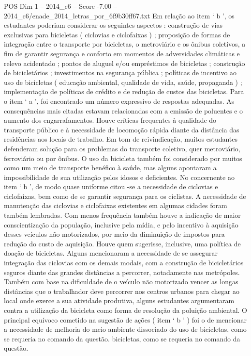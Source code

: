 \begin{textsample}{POS Dim 1 – 2014\_c6 – Score -7.00 – 2014\_c6/enade\_2014\_letras\_por\_6f9b30ff67.txt}
Em relação ao item ‘ b ’, os estudantes poderiam considerar os seguintes aspectos : construção de vias exclusivas para bicicletas ( ciclovias e ciclofaixas ) ; proposição de formas de integração entre o transporte por bicicletas, o metroviário e os ônibus coletivos, a fim de garantir segurança e conforto em momentos de adversidades climáticas e relevo acidentado ; pontos de aluguel e/ou empréstimos de bicicletas ; construção de bicicletários ; investimentos na segurança pública ; políticas de incentivo ao uso de bicicletas ( educação ambiental, qualidade de vida, saúde, propaganda ) ; implementação de políticas de crédito e de redução de custos das bicicletas.
Para o item ‘ a ’, foi encontrado um número expressivo de respostas adequadas.
As consequências mais citadas estavam relacionadas com a emissão de poluentes e o aumento dos engarrafamentos.
Houve críticas frequentes à qualidade do transporte público e à necessidade de locomoção rápida diante da distância das residências aos locais de trabalho.
Em tom de reivindicação, muitos estudantes defenderam solução para os problemas do transporte coletivo, quer metroviário, ferroviário ou por ônibus.
O uso da bicicleta também foi considerado por muitos como um meio de transporte benéfico à saúde, mas alguns apontaram a impossibilidade de sua utilização pelos idosos e deficientes.
No concernente ao item ‘ b ’, de modo quase uniforme citou -se a necessidade de ciclovias e ciclofaixas, bem como de se garantir segurança para os ciclistas.
A necessidade de manutenção das ciclovias e ciclofaixas existentes em algumas cidades foram também lembradas.
Com menos frequência também houve a indicação de maior conscientização da população, inclusive pela mídia, e pelo incentivo à aquisição desses veículos não motorizados, por meio da diminuição de impostos para redução do custo de aquisição.
Houve quem sugerisse, inclusive, uma política de doação de bicicletas.
Alguns mencionaram a necessidade de se assegurar integração das ciclovias com os demais modais, com a construção de bicicletários seguros diante das grandes distâncias a percorrer, notadamente nas metrópoles.
Também com base na dificuldade de o veículo não motorizado vencer as longas distâncias que o trabalhador deve percorrer nos centros urbanos para chegar ao local onde exerce a sua atividade produtiva, alguns estudantes argumentaram contra a utilização da bicicleta como forma de resolução da poluição ambiental.
O principal equívoco cometido na sugestão de ações ( item ‘ b ’ ) foi o de mencionar a necessidade de melhoria do meio ambiente dissociado do uso de bicicletas, como se requeria no comando da questão. bicicletas, como se requeria no comando da questão.

\end{textsample}
